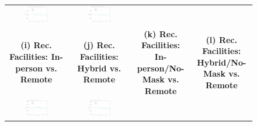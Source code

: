 \documentclass[9pt,twoside,lineno]{pnas-new}
\theoremstyle{definition}
\begin{document}
\begin{figure}[!ht]
{\begin{minipage}{\linewidth}
\begin{tabular}{cccc}
 \includegraphics[width=0.4\textwidth]{tables_and_figures/event_bar_csfullno.pdf}& \includegraphics[width=0.4\textwidth]{tables_and_figures/event_bar_cshybridno.pdf}  \smallskip\\ 
  \textbf{(i) Rec. Facilities: In-person vs. Remote }&\textbf{(j) Rec. Facilities: Hybrid vs. Remote}&\textbf{(k) Rec. Facilities: In-person/No-Mask vs. Remote}&\textbf{(l) Rec. Facilities:  Hybrid/No-Mask vs. Remote}\smallskip\\ 
 \includegraphics[width=0.4\textwidth]{tables_and_figures/event_gym_csfull.pdf}& \includegraphics[width=0.4\textwidth]{tables_and_figures/event_gym_cshybrid.pdf} 
 &

\end{tabular}
\end{minipage}}
\end{figure}
\end{document}
